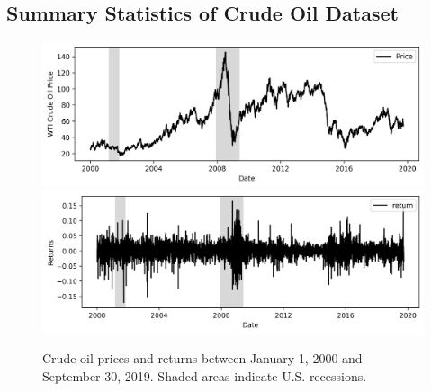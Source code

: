 \documentclass[12pt]{article}
\begin{document}
	\subsection{Summary Statistics of Crude Oil Dataset}
	\begin{figure}[H]
		\small
		\centering
		\includegraphics[width=\linewidth]{figures/wti_summary/prices.png}
		\includegraphics[width=\linewidth]{figures/wti_summary/returns.png}
		\caption{Crude oil prices and returns between January 1, 2000 and September 30, 2019. Shaded areas indicate U.S. recessions.}
	\end{figure}
\end{document}
